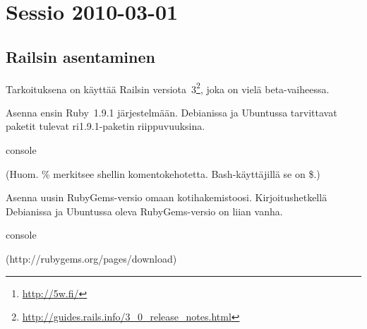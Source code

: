 \documentclass{article}
\title{\eng{5w Ruby on Rails workshop}}
\author{Johan Kiviniemi}
\begin{document}
\maketitle

\begin{abstract}
Dokumentaatio 5w:n\footnote{\url{http://5w.fi/}}, Tampereen hackerspacen,
Rails-opiskeluprojektista.
\end{abstract}

\tableofcontents

\section{Sessio 2010-03-01}

\subsection{Railsin asentaminen}

\begin{samepage}
Tarkoituksena on käyttää Railsin
versiota~3\footnote{\url{http://guides.rails.info/3\_0\_release\_notes.html}},
joka on vielä beta-vaiheessa.

Asenna ensin Ruby~1.9.1 järjestelmään. Debianissa ja Ubuntussa tarvittavat
paketit tulevat ri1.9.1-paketin riippuvuuksina.

\begin{pygmented}{console}
\end{pygmented}

(Huom. \% merkitsee shellin komentokehotetta. Bash-käyttäjillä se on \$.)
\end{samepage}

\begin{samepage}
Asenna uusin RubyGems-versio omaan kotihakemistoosi. Kirjoitushetkellä
Debianissa ja Ubuntussa oleva RubyGems-versio on liian vanha.

\begin{pygmented}{console}

(http://rubygems.org/pages/download)



\end{pygmented}
\end{samepage}
\end{document}
